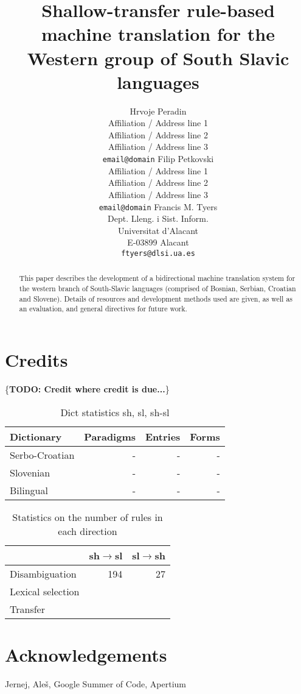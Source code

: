 \documentclass[11pt]{article}
\title{Shallow-transfer rule-based machine translation for the Western group of South Slavic languages}
\author{Hrvoje Peradin\\
  Affiliation / Address line 1\\
  Affiliation / Address line 2\\
  Affiliation / Address line 3\\
  {\tt email@domain}  \And
  Filip Petkovski \\
  Affiliation / Address line 1\\
  Affiliation / Address line 2\\
  Affiliation / Address line 3\\
  {\tt email@domain}  \And
  Francis M. Tyers\\
  Dept. Lleng. i Sist. Inform.\\
  Universitat d'Alacant\\
  E-03899 Alacant\\
  {\tt ftyers@dlsi.ua.es}}
\date{}
\newcommand{\todo}[1]{\{\textbf{TODO: #1}\}}
\begin{document}
\maketitle
\begin{abstract}
  This paper describes the development of a bidirectional machine
  translation system for the western branch of South-Slavic languages
  (comprised of Bosnian, Serbian, Croatian and Slovene). Details of
  resources and development methods used are given, as well as an
  evaluation, and general directives for future work.
\end{abstract}

\section{Credits}

\todo{Credit where credit is due...}







\begin{table}

\begin{tabular}{lrrr}
\textbf{Dictionary} & \textbf{Paradigms} & \textbf{Entries} & \textbf{Forms} \\
\hline
Serbo-Croatian &  - & - & - \\
Slovenian &  - & - & - \\
\hline
Bilingual &  - & - & - \\
\hline
\end{tabular}
\caption{ Dict statistics sh, sl, sh-sl}

\end{table}

\begin{table}

\begin{tabular}{lrr}
               & sh$\rightarrow$sl & sl$\rightarrow$sh \\
\hline
Disambiguation &     194              &     27 \\
Lexical selection &                   &  \\
Transfer &                   &  \\

\end{tabular}
 \caption{Statistics on the number of rules in each direction}
\end{table}







\section*{Acknowledgements}

Jernej, Ale\v{s}, Google Summer of Code, Apertium



\end{document}
